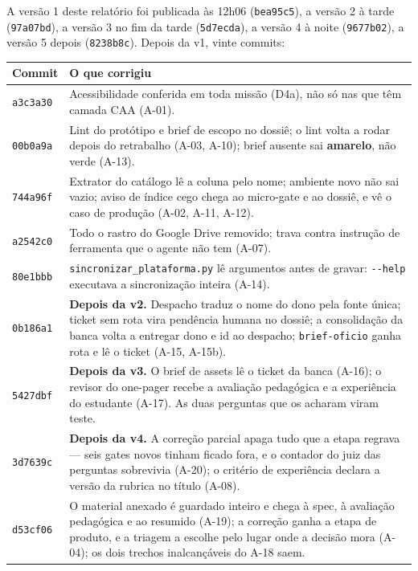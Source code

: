 \documentclass[11pt,a4paper]{article}
\newcommand{\amarelo}{\textcolor{DarkYellow}{\textbf{amarelo}}}
\begin{document}
A versão 1 deste relatório foi publicada às 12h06 (\texttt{bea95c5}), a versão 2 à tarde (\texttt{97a07bd}), a versão 3 no fim da tarde (\texttt{5d7ecda}), a versão 4 à noite (\texttt{9677b02}), a versão 5 depois (\texttt{8238b8c}). Depois da v1, vinte commits:

\begin{center}
\small
\begin{tabular}{@{}p{1.7cm}p{13.6cm}@{}}
\toprule
\textbf{Commit} & \textbf{O que corrigiu} \\
\midrule
\texttt{a3c3a30} & Acessibilidade conferida em toda missão (D4a), não só nas que têm camada CAA (A-01). \\
\texttt{00b0a9a} & Lint do protótipo e brief de escopo no dossiê; o lint volta a rodar depois do retrabalho (A-03, A-10); brief ausente sai \amarelo{}, não verde (A-13). \\
\texttt{744a96f} & Extrator do catálogo lê a coluna pelo nome; ambiente novo não sai vazio; aviso de índice cego chega ao micro-gate e ao dossiê, e vê o caso de produção (A-02, A-11, A-12). \\
\texttt{a2542c0} & Todo o rastro do Google Drive removido; trava contra instrução de ferramenta que o agente não tem (A-07). \\
\texttt{80e1bbb} & \texttt{sincronizar\_plataforma.py} lê argumentos antes de gravar: \texttt{-{}-help} executava a sincronização inteira (A-14). \\
\midrule
\texttt{0b186a1} & \textbf{Depois da v2.} Despacho traduz o nome do dono pela fonte única; ticket sem rota vira pendência humana no dossiê; a consolidação da banca volta a entregar dono e id ao despacho; \texttt{brief-oficio} ganha rota e lê o ticket (A-15, A-15b). \\
\texttt{5427dbf} & \textbf{Depois da v3.} O brief de assets lê o ticket da banca (A-16); o revisor do one-pager recebe a avaliação pedagógica e a experiência do estudante (A-17). As duas perguntas que os acharam viram teste. \\
\texttt{3d7639c} & \textbf{Depois da v4.} A correção parcial apaga tudo que a etapa regrava --- seis gates novos tinham ficado fora, e o contador do juiz das perguntas sobrevivia (A-20); o critério de experiência declara a versão da rubrica no título (A-08). \\
\texttt{d53cf06} & O material anexado é guardado inteiro e chega à spec, à avaliação pedagógica e ao resumido (A-19); a correção ganha a etapa de produto, e a triagem a escolhe pelo lugar onde a decisão mora (A-04); os dois trechos inalcançáveis do A-18 saem. \\

\end{tabular}
\end{center}
\end{document}
